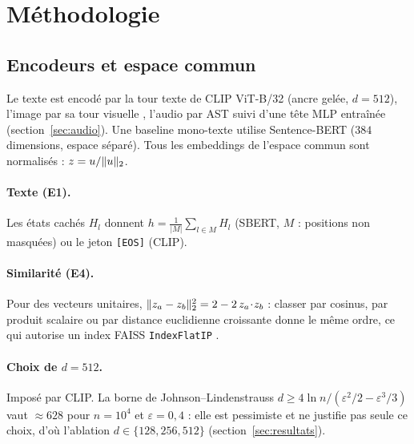 \section{Méthodologie}\label{sec:methode}
\subsection{Encodeurs et espace commun}
Le texte est encodé par la tour texte de CLIP ViT-B/32 \cite{radford2021clip} (ancre gelée, $d=512$), l'image par sa tour
visuelle \cite{dosovitskiy2021vit}, l'audio par AST \cite{gong2021ast} suivi d'une tête MLP entraînée (section~\ref{sec:audio}).
Une baseline mono-texte utilise Sentence-BERT \cite{reimers2019sbert} ($384$ dimensions, espace séparé). Tous les
embeddings de l'espace commun sont normalisés : $z=u/\lVert u\rVert_2$.

\paragraph{Texte (E1).} Les états cachés $H_l$ donnent $h=\frac{1}{|M|}\sum_{l\in M}H_l$ (SBERT, $M$ : positions non masquées)
ou le jeton \texttt{[EOS]} (CLIP).

\paragraph{Similarité (E4).} Pour des vecteurs unitaires, $\lVert z_a-z_b\rVert_2^2=2-2\,z_a\!\cdot\! z_b$ : classer par cosinus, par
produit scalaire ou par distance euclidienne croissante donne le même ordre, ce qui autorise un index FAISS
\texttt{IndexFlatIP} \cite{johnson2021faiss}.

\paragraph{Choix de $d=512$.} Imposé par CLIP. La borne de Johnson--Lindenstrauss
$d\ge 4\ln n/(\varepsilon^2/2-\varepsilon^3/3)$ vaut $\approx 628$ pour $n=10^4$ et $\varepsilon=0{,}4$ : elle est pessimiste et ne
justifie pas seule ce choix, d'où l'ablation $d\in\{128,256,512\}$ (section~\ref{sec:resultats}).

